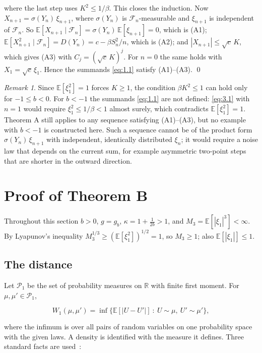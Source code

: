\documentclass[aip,jmp,preprint,onecolumn,floatfix,superscriptaddress,nofootinbib,11pt]{revtex4-2}
\theoremstyle{plain}
\theoremstyle{remark}
\newtheorem*{remark}{Remark}
\numberwithin{equation}{section}
\newcommand{\E}{\mathbb{E}}
\begin{document}
where the last step uses $K^{2}\le1/\beta$. This closes the induction. Now $X_{n+1}=\sigma(Y_n)\,\xi_{n+1}$, where $\sigma(Y_n)$ is $\mathcal F_n$-measurable and $\xi_{n+1}$ is independent of $\mathcal F_n$. So $\E[X_{n+1}\mid\mathcal F_n]=\sigma(Y_n)\,\E[\xi_{n+1}]=0$, which is (A1); $\E[X_{n+1}^{2}\mid\mathcal F_n]=D(Y_n)=c-\beta S_n^{2}/n$, which is (A2); and $|X_{n+1}|\le\sqrt c\,K$, which gives (A3) with $C_j=(\sqrt c\,K)^{j}$. For $n=0$ the same holds with $X_1=\sqrt c\,\xi_1$. Hence the summands \eqref{eq:1.1} satisfy (A1)--(A3). \qed

\begin{remark}
Since $\E[\xi_1^{2}]=1$ forces $K\ge1$, the condition $\beta K^{2}\le1$ can hold only for $-1\le b<0$. For $b<-1$ the summands \eqref{eq:1.1} are not defined: \eqref{eq:3.1} with $n=1$ would require $\xi_1^{2}\le1/\beta<1$ almost surely, which contradicts $\E[\xi_1^{2}]=1$. Theorem A still applies to any sequence satisfying (A1)--(A3), but no example with $b<-1$ is constructed here. Such a sequence cannot be of the product form $\sigma(Y_n)\,\xi_{n+1}$ with independent, identically distributed $\xi_n$; it would require a noise law that depends on the current sum, for example asymmetric two-point steps that are shorter in the outward direction.
\end{remark}

\section{Proof of Theorem B}\label{sec:4}


Throughout this section $b>0$, $g=g_b$, $\kappa=1+\tfrac{1}{2b}>1$, and $M_3=\E[|\xi_1|^{3}]<\infty$. By Lyapunov's inequality $M_3^{1/3}\ge(\E[\xi_1^{2}])^{1/2}=1$, so $M_3\ge1$; also $\E[|\xi_1|]\le1$.

\subsection{The distance}\label{sec:4_1}

Let $\mathcal P_1$ be the set of probability measures on $\mathbb R$ with finite first moment. For $\mu,\mu'\in\mathcal P_1$,

\begin{equation*}
W_1(\mu,\mu')=\inf\big\{\E[|U-U'|]\ :\ U\sim\mu,\ U'\sim\mu'\big\},
\end{equation*}

where the infimum is over all pairs of random variables on one probability space with the given laws. A density is identified with the measure it defines. Three standard facts are used~\cite{Villani}:
\end{document}
